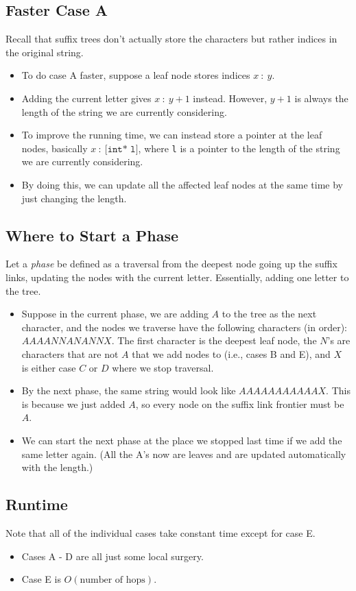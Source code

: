 \documentclass[10pt]{article}
\begin{document}
\subsection*{Faster Case A}
Recall that suffix trees don't actually store the characters but rather indices in the original string.  
\begin{itemize}
	\item To do case A faster, suppose a leaf node stores indices $x \::\: y$.  
	\item Adding the current letter gives $x \::\: y + 1$ instead.  However, $y + 1$ is always the length of the string we are currently considering.
	\item To improve the running time, we can instead store a pointer at the leaf nodes, basically $x \::\: \texttt{[int* l]}$, where \texttt{l} is a pointer to the length of the string we are currently considering.
	\item By doing this, we can update all the affected leaf nodes at the same time by just changing the length.
\end{itemize}

\subsection*{Where to Start a Phase}
Let a \textit{phase} be defined as a traversal from the deepest node going up the suffix links, updating the nodes with the current letter.  Essentially, adding one letter to the tree.
\begin{itemize}
	\item Suppose in the current phase, we are adding $A$ to the tree as the next character, and the nodes we traverse have the following characters (in order): $AAAANNANANNX$.  The first character is the deepest leaf node, the $N$'s are characters that are not $A$ that we add nodes to (i.e., cases B and E), and $X$ is either case $C$ or $D$ where we stop traversal.
	\item By the next phase, the same string would look like $AAAAAAAAAAAX$.  This is because we just added $A$, so every node on the suffix link frontier must be $A$.
	\item We can start the next phase at the place we stopped last time if we add the same letter again.  (All the A's now are leaves and are updated automatically with the length.)
\end{itemize}

\subsection*{Runtime}
Note that all of the individual cases take constant time except for case E.  
\begin{itemize}
	\item Cases A - D are all just some local surgery.
	\item Case E is $O(\text{number of hops})$.
\end{itemize}
\end{document}
